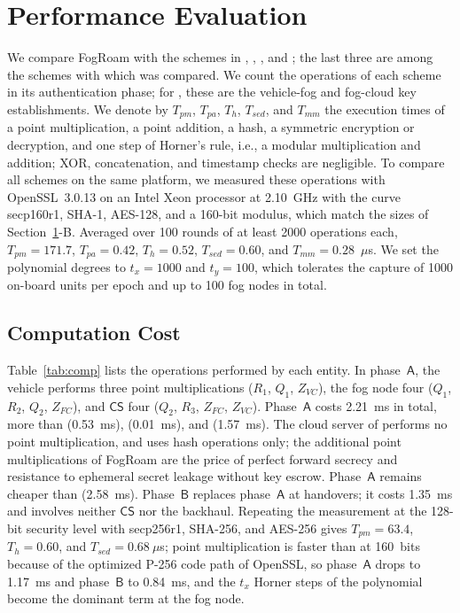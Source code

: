 \documentclass[journal]{IEEEtran}
\theoremstyle{plain}
\theoremstyle{definition}
\newcommand{\CS}{\mathsf{CS}}            %
\newcommand{\Tpm}{T_{pm}}                %
\newcommand{\Tpa}{T_{pa}}
\newcommand{\Th}{T_{h}}
\newcommand{\Tsed}{T_{sed}}
\newcommand{\Tmm}{T_{mm}}
\newcommand{\protocol}{\textsf{FogRoam}}   %
\begin{document}
\section{Performance Evaluation}\label{sec:perf}
We compare {\protocol} with the schemes in \cite{chen2024provably}, \cite{ma2019efficient}, \cite{wazid2019akm}, and \cite{eftekhari2021security}; the last three are among the schemes with which \cite{chen2024provably} was compared. We count the operations of each scheme in its authentication phase; for \cite{wazid2019akm}, these are the vehicle-fog and fog-cloud key establishments. We denote by $\Tpm$, $\Tpa$, $\Th$, $\Tsed$, and $\Tmm$ the execution times of a point multiplication, a point addition, a hash, a symmetric encryption or decryption, and one step of Horner's rule, i.e., a modular multiplication and addition; XOR, concatenation, and timestamp checks are negligible. To compare all schemes on the same platform, we measured these operations with OpenSSL~3.0.13 on an Intel Xeon processor at 2.10~GHz with the curve secp160r1, SHA-1, AES-128, and a 160-bit modulus, which match the sizes of Section~\ref{sec:perf}-B. Averaged over 100 rounds of at least 2000 operations each, $\Tpm=171.7$, $\Tpa=0.42$, $\Th=0.52$, $\Tsed=0.60$, and $\Tmm=0.28$~$\mu$s. We set the polynomial degrees to $t_x=1000$ and $t_y=100$, which tolerates the capture of 1000 on-board units per epoch and up to 100 fog nodes in total.

\subsection{Computation Cost}
Table~\ref{tab:comp} lists the operations performed by each entity. In phase~$\mathsf{A}$, the vehicle performs three point multiplications ($R_1$, $Q_1$, $Z_{VC}$), the fog node four ($Q_1$, $R_2$, $Q_2$, $Z_{FC}$), and $\CS$ four ($Q_2$, $R_3$, $Z_{FC}$, $Z_{VC}$). Phase~$\mathsf{A}$ costs 2.21~ms in total, more than \cite{chen2024provably} (0.53~ms), \cite{wazid2019akm} (0.01~ms), and \cite{eftekhari2021security} (1.57~ms). The cloud server of \cite{chen2024provably} performs no point multiplication, and \cite{wazid2019akm} uses hash operations only; the additional point multiplications of {\protocol} are the price of perfect forward secrecy and resistance to ephemeral secret leakage without key escrow. Phase~$\mathsf{A}$ remains cheaper than \cite{ma2019efficient} (2.58~ms). Phase~$\mathsf{B}$ replaces phase~$\mathsf{A}$ at handovers; it costs 1.35~ms and involves neither $\CS$ nor the backhaul. Repeating the measurement at the 128-bit security level with secp256r1, SHA-256, and AES-256 gives $\Tpm=63.4$, $\Th=0.60$, and $\Tsed=0.68~\mu$s; point multiplication is faster than at 160~bits because of the optimized P-256 code path of OpenSSL, so phase~$\mathsf{A}$ drops to 1.17~ms and phase~$\mathsf{B}$ to 0.84~ms, and the $t_x$ Horner steps of the polynomial become the dominant term at the fog node.
\end{document}
